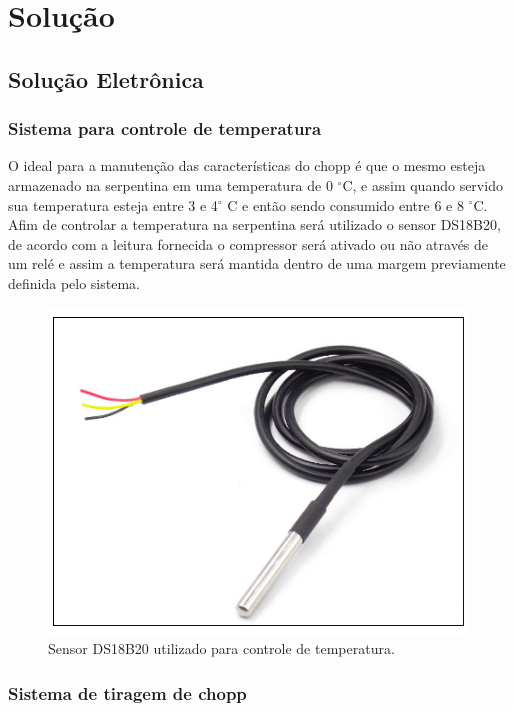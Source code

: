 \chapter[Solução]{Solução}

	\section[Solução Eletrônica]{Solução Eletrônica}
		\subsection[Sistema para controle de temperatura]{Sistema para controle de temperatura}
			O ideal para a manutenção das características do chopp é que o mesmo esteja armazenado na serpentina em uma temperatura de 0 $^{\circ}$C, e assim quando servido sua temperatura esteja entre 3 e 4$^{\circ}$ C e então sendo consumido entre 6 e 8 $^{\circ}$C. Afim de controlar a temperatura na serpentina será utilizado o sensor DS18B20, de acordo com a leitura fornecida o compressor será ativado ou não através de um relé e assim a temperatura será mantida dentro de uma margem previamente definida pelo sistema.

			\begin{figure}[H]
				\centering
				\includegraphics[scale= 0.7]{figuras/sensor-temperatura.png}
				\caption{Sensor DS18B20 utilizado para controle de temperatura.}
				\label{sensor-temperatura}
			\end{figure}

		\subsection[Sistema de tiragem de chopp]{Sistema de tiragem de chopp}
